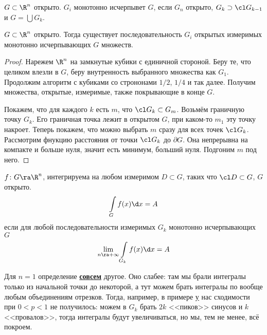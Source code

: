 \begin{Def}
	$G \subset \R^n$ открыто.
	${G_i}$ монотонно исчерпывет $G$, если $G_n$ открыто, $G_k \supset \cl G_{k-1}$ и $G = \bigcup G_k$.
\end{Def}

\begin{theorem}
	$G \subset \R^n$ открыто.
	Тогда существует последовательность $G_i$ открытых измеримых монотонно исчерпывающих $G$ множеств.
\end{theorem}

\begin{proof}
	Нарежем $\R^n$ на замкнутые кубики с единичной стороной.
	Беру те, что целиком влезли в $G$, беру внутренность выбранного множества как $G_1$.
	Продолжим алгоритм с кубиками со стрононами $1/2$, $1/4$ и так далее.
	Получим множества, открытые, измеримые, также покрывающие в конце $G$.

	Покажем, что для каждого $k$ есть $m$, что $\cl G_k \subset G_m$.
	Возьмём граничную точку $G_k$. Его граничная точка лежит в открытом $G$, при каком-то $m_1$ эту точку накроет.
	Теперь покажем, что можно выбрать $m$ сразу для всех точек $\cl G_k$.
	Рассмотрим фнукцию расстояния от точки $\cl G_k$ до $\partial G$.
	Она непрерывна на компакте и больше нуля, значит есть минимум, больший нуля.
	Подгоним $m$ под него.
\end{proof}

\begin{Def}
	$f\colon G \ra \R^n$, интегрируема на любом измеримом $D \subset G$, таких что $\cl D \subset G$, $G$ открыто.
	\[ \int\limits_G f(x) \d x = A \]
	если для любой последовательности измеримых $G_k$ монотонно исчерпывающих $G$
	\[ \lim_{n\ra+\infty} \int\limits_{G_k} f(x) \d x = A \]
\end{Def}
\begin{Rem}
	Для $n = 1$ определение \underline{\bf совсем} другое.
	Оно слабее: там мы брали интегралы только из начальной точки до некоторой, а тут можем брать интегралы по вообще любым объединениям отрезков.
	Тогда, например, в примере \href{exmpIntFracSin} у нас сходимости при $0<p<1$ не получилось: можем в $G_k$ брать $2k$ <<пиков>> синусов и $k$ <<провалов>>,
	тогда интегралы будут увеличиваться, но мы, тем не менее, всё покроем.
\end{Rem}

